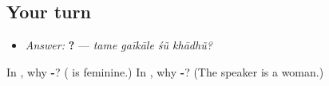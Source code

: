 \subsection*{Your turn}
\begin{itemize}
\raggedright
  \item \emph{Answer:} \textbf{   ?} — \emph{tame gaīkāle śũ khādhũ?}
\end{itemize}

\begin{tcolorbox}[breakable,colback=teal!4,colframe=teal!35!black,title={Before you move on}]
In \textbf{  }, why \textbf{-}? (\textbf{} is feminine.) In \textbf{  }, why \textbf{-}? (The speaker is a woman.)
\end{tcolorbox}
